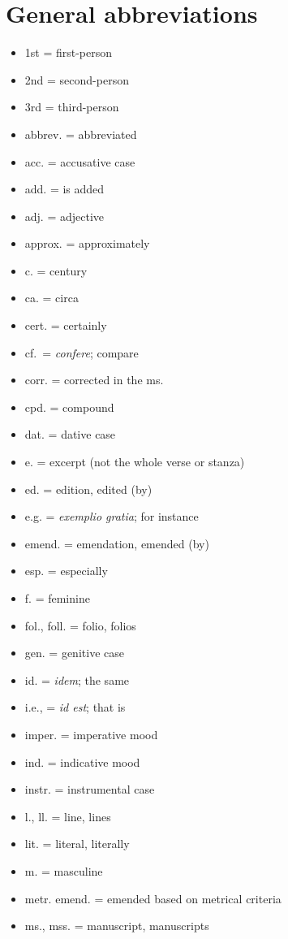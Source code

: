 \section{General abbreviations}
\begin{itemize}%
	\item 1st = first-person
	\item 2nd = second-person
	\item 3rd = third-person
	\item abbrev. = abbreviated
	\item acc. = accusative case
	\item add. = is added
	\item adj. = adjective
	\item approx. = approximately
	\item c. = century
	\item ca. = circa
	\item cert. = certainly
	\item cf.~= \emph{confere}; compare
	\item corr. = corrected in the ms.
	\item cpd. = compound
	\item dat. = dative case
	\item e. = excerpt (not the whole verse or stanza)
	\item ed. = edition, edited (by)
	\item e.g. = \emph{exemplio gratia}; for instance
	\item emend. = emendation, emended (by)
	\item esp. = especially
	\item f. = feminine
	\item fol., foll. = folio, folios
	\item gen. = genitive case
	\item id. = \emph{idem}; the same
	\item i.e., = \emph{id est}; that is
	\item imper. = imperative mood
	\item ind. = indicative mood
	\item instr. = instrumental case
	\item l., ll. = line, lines
	\item lit. = literal, literally
	\item m. = masculine
	\item metr. emend. = emended based on metrical criteria
	\item ms., mss. = manuscript, manuscripts

\end{itemize}
